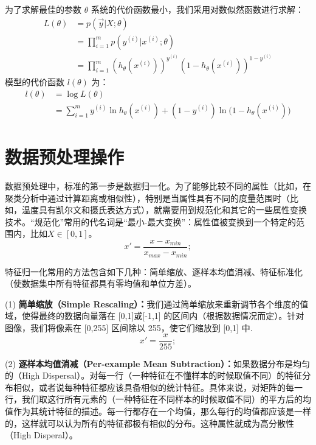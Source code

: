 \documentclass[oneside]{ZJUthesis}
\begin{document}
为了求解最佳的参数 $\theta$ 系统的代价函数最小，我们采用对数似然函数进行求解：
\begin{equation}\begin{aligned}
	L(\theta)&=p(\overrightarrow {y}|X;\theta)\\
		 &=\prod\limits_{i = 1}^m {p(y^{(i)}|x^{(i)};\theta)} \\
		 &=\prod\limits_{i = 1}^m {(h_{\theta}(x^{(i)}))^{y^{(i)}}(1-h_{\theta}(x^{(i)}))^{1-y^{(i)}}}
\end{aligned}\end{equation}
模型的代价函数 $l(\theta)$ 为：
\begin{equation}\begin{aligned}
	l(\theta)&=\log L(\theta) \\
		&=\sum\limits_{i = 1}^m {y^{(i)} \ln h_{\theta}(x^{(i)})+(1-y^{(i)}) \ln (1-h_{\theta}(x^{(i)})})
\end{aligned}\end{equation}


\section{数据预处理操作}
数据预处理中，标准的第一步是数据归一化。为了能够比较不同的属性（比如，在聚类分析中通过计算距离或相似性），特别是当属性具有不同的度量范围时（比如，温度具有凯尔文和摄氏表达方式），就需要用到规范化和其它的一些属性变换技术。``规范化''常用的代名词是``最小-最大变换''：属性值被变换到一个特定的范围内，比如$X \in [0,1]$。
\begin{equation}
	x'=\frac{x-x_{min}}{x_{max}-x_{min}};
\end{equation}

特征归一化常用的方法包含如下几种：简单缩放、逐样本均值消减、特征标准化（使数据集中所有特征都具有零均值和单位方差）\cite{DBLP:journals/prl/AksoyH01}。

(1) \textbf{简单缩放（Simple Rescaling）：}我们通过简单缩放来重新调节各个维度的值域，使得最终的数据向量落在 [0,1]或[-1,1] 的区间内（根据数据情况而定）。针对图像，我们将像素在 [0,255] 区间除以 255，使它们缩放到 [0,1] 中.
\begin{equation}
	x'=\frac{x}{255};
\end{equation}

(2) \textbf{逐样本均值消减（Per-example Mean Subtraction）：}如果数据分布是均匀的（High Dispersal）。对每一行（一种特征在不懂样本的时候取值不同）的特征分布相似，或者说每种特征都应该具备相似的统计特征。具体来说，对矩阵的每一行，我们取这行所有元素的（一种特征在不同样本的时候取值不同）的平方后的均值作为其统计特征的描述。每一行都存在一个均值，那么每行的均值都应该是一样的，这样就可以认为所有的特征都极有相似的分布。这种属性就成为高分散性（High Disperal）。
\end{document}
